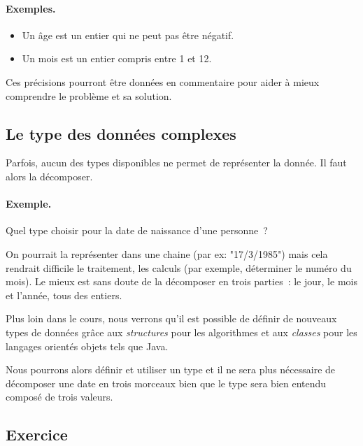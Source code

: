 			\clearpage
			\begin{Emphase}
				\paragraph{Exemples.}	
				\begin{itemize} 
				\item Un âge est un entier qui ne peut pas être négatif.
				\item Un mois est un entier compris entre 1 et 12.
				\end{itemize}
			\end{Emphase}
			
			Ces précisions pourront être données en commentaire
			pour aider à mieux comprendre le problème et sa solution.
	
		\subsection{Le type des données complexes}
		
			Parfois, aucun des types disponibles ne permet de représenter 
			la donnée.
			Il faut alors la décomposer.
			
			\begin{Emphase}
				\paragraph{Exemple.}	
				Quel type choisir 
				pour la date de naissance d’une personne~?
				
				On pourrait la représenter dans une chaine 
				(par ex: "17/3/1985")
				mais cela rendrait difficile le traitement, les calculs
				(par exemple, déterminer le numéro du mois).
				Le mieux est sans doute de la décomposer en trois parties~: 
				le jour, le mois et l’année, tous des entiers.
			\end{Emphase}
			
			Plus loin dans le cours,
			nous verrons qu’il est possible de définir de nouveaux
			types de données grâce aux \emph{structures} pour les algorithmes et 
			aux \emph{classes} pour les langages orientés objets tels que Java. 
			
			Nous pourrons alors définir et utiliser un type 
			et il ne sera plus nécessaire de décomposer une date en trois
			morceaux bien que le type sera bien entendu composé de trois valeurs.

	
		\subsection{Exercice}
		
